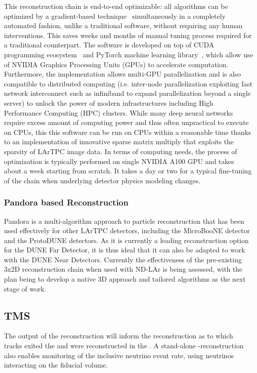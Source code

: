 \documentclass[../main-v1.tex]{subfiles}
\begin{document}
This reconstruction chain is end-to-end optimizable: all algorithms can be optimized by a gradient-based technique~\cite{Rumelhart1986} simultaneously in a completely automated fashion, unlike a traditional software, without requiring any human interventions. This saves weeks and months of manual tuning process required for a traditional counterpart. The software is developed on top of CUDA programming ecosystem~\cite{10.1145/1365490.1365500} and PyTorch machine learning library~\cite{NEURIPS2019_9015},
which allow use  of NVIDIA Graphics Processing Units (GPUs) to accelerate computation. Furthermore, the implementation allows multi-GPU parallelization and is also compatible to distributed computing (i.e. inter-node parallelization exploiting fast network interconnect such as infiniband to expand parallelization beyond a single server) to unlock the power of modern infrastructures including High Performance Computing (HPC) clusters. While many deep neural networks require excess amount of computing power and thus often unpractical to execute on CPUs, this this software can be run on CPUs within a reasonable time thanks to an implementation of innovative sparse matrix multiply that exploits the sparsity of LArTPC image data. In terms of computing needs, the process of optimization is typically performed on single NVIDIA A100 GPU and takes about a week starting from scratch. It takes a day or two for a typical fine-tuning of the chain when underlying detector physics modeling changes. 
 
 \subsubsection{Pandora based Reconstruction}
 Pandora is a multi-algorithm approach to particle reconstruction that has been used effectively for other LArTPC detectors, including the MicroBooNE detector and the ProtoDUNE detectors. As it is currently a leading reconstruction option for the DUNE Far Detector, it is thus ideal that it can also be adapted to work with the DUNE Near Detectors. Currently the effectiveness of the pre-existing 3x2D reconstruction chain when used with ND-LAr is being assessed, with the plan being to develop a native 3D approach and tailored algorithms as the next stage of work.

\subsection{TMS}
The output of the  reconstruction will inform the  reconstruction as to which tracks exited the  and were reconstructed in the . A stand-alone -reconstruction also enables monitoring of the inclusive neutrino event rate, using neutrinos interacting on the  fiducial volume.
\end{document}
